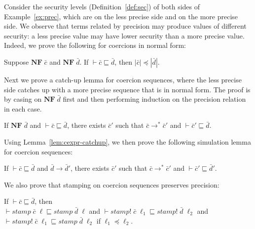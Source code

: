 Consider the security levels (Definition~\ref{def:sec}) of both sides
of Example~\ref{ex:prec}, which are \low on the less precise side and
\high on the more precise side.
We observe that \Surface terms related by precision may produce
values of different security: a less precise value may have lower
security than a more precise value. Indeed, we prove the following for
coercions in normal form:

\begin{lemma}
\label{lem:prec-sec}
Suppose $\mathbf{NF}\; \bar{c}$ and $\mathbf{NF}\; \bar{d}$. If $\vdash \bar{c} \sqsubseteq \bar{d}$, then $| \bar{c} | \preccurlyeq | \bar{d} |$.
\end{lemma}

Next we prove a catch-up lemma for coercion sequences, where the less
precise side catches up with a more precise sequence that is in normal
form. The proof is by casing on $\mathbf{NF}\;\bar{d}$ first and then
performing induction on the precision relation in each case.

\begin{lemma}
\label{lem:cexpr-catchup}
If $\mathbf{NF}\; \bar{d}$ and $\vdash \bar{c} \sqsubseteq \bar{d}$,
there exists $\bar{c}'$ such that $\bar{c} \longrightarrow^{*} \bar{c}'$
and $\vdash \bar{c}' \sqsubseteq \bar{d}$.
\end{lemma}

\noindent Using Lemma~\ref{lem:cexpr-catchup}, we then prove the following
simulation lemma for coercion sequences:

\begin{lemma}
\label{lem:cexpr-sim}
If $\vdash \bar{c} \sqsubseteq \bar{d}$ and $\bar{d} \longrightarrow \bar{d}'$,
there exists $\bar{c}'$ such that $\bar{c} \longrightarrow^{*} \bar{c}'$
and $\vdash \bar{c}' \sqsubseteq \bar{d}'$.
\end{lemma}

We also prove that stamping on coercion sequences preserves precision:

\begin{lemma}
\label{lem:cexpr-stamp-sim}
If $\vdash \bar{c} \sqsubseteq \bar{d}$, then \\ $\vdash \mathit{stamp}\;\bar{c}\;\ell \sqsubseteq \mathit{stamp}\;\bar{d}\;\ell$
and $\vdash \mathit{stamp!}\;\bar{c}\;\ell_1 \sqsubseteq \mathit{stamp!}\;\bar{d}\;\ell_2$ and
$\vdash \mathit{stamp!}\;\bar{c}\;\ell_1 \sqsubseteq \mathit{stamp}\;\bar{d}\;\ell_2$ if $\ell_1 \preccurlyeq \ell_2$.
\end{lemma}


